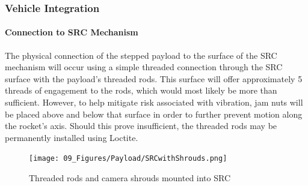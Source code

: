 \documentclass[class=article, crop=false]{standalone}
\begin{document}
	
	
	
	\subsubsection{Vehicle Integration}
	
	\paragraph{Connection to SRC Mechanism}
	\label{paragraph:payload_to_src}
	The physical connection of the stepped payload to the surface of the SRC mechanism will occur using a simple threaded connection through the SRC surface with the payload's threaded rods. This surface will offer approximately 5 threads of engagement to the rods, which would most likely be more than sufficient. However, to help mitigate risk associated with vibration, jam nuts will be placed above and below that surface in order to further prevent motion along the rocket's axis. Should this prove insufficient, the threaded rods may be permanently installed using Loctite.
	
	\bigbreak
	
	\FloatBarrier{}
	\begin{figure}[!h]
		\centering
		\texttt{[image: 09\_Figures/Payload/SRCwithShrouds.png]}
		\caption{Threaded rods and camera shrouds mounted into SRC}
		\label{fig:payloadConnectSRC}
	\end{figure}
	\FloatBarrier{}
	
\end{document}
